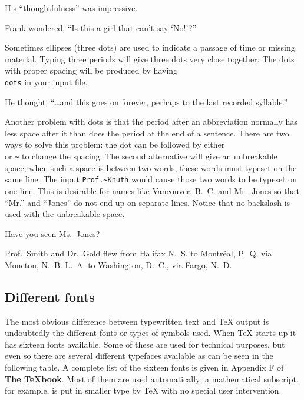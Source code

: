 \exercise His ``thoughtfulness'' was impressive. 

\exercise Frank wondered, ``Is this a girl that can't say `No!'?'' 
\bigskip 

Sometimes ellipses (three dots) are used to indicate a passage 
of time or missing material.  Typing three periods will give 
three dots very close together. The dots with proper spacing will 
be produced by having {\tt \\dots} in your input file. 

\exercise He thought, ``\dots and this goes on forever, perhaps to the 
last recorded syllable.'' 

Another problem with dots is that the period after an 
abbreviation normally has less space after it than does the 
period at the end of a sentence. There are two ways to solve this 
problem: the dot can be followed by either {\tt\\\sp} or {\tt\~{}} 
to change the spacing. 
The second alternative will give an unbreakable space; when such 
a space is between two words, these words must typeset on the 
same line. The input {\tt Prof.\~{}Knuth} would cause those two 
words to be typeset on one line.  This is desirable for names 
like Vancouver, B.~C. and Mr.~Jones so that ``Mr.'' and ``Jones'' 
do not end up on separate lines. Notice that no backslash is used 
with the unbreakable space. 

\exercise Have you seen Ms.~Jones? 

\exercise Prof.~Smith and Dr.~Gold flew from 
\ifcanspell 
Halifax N.~S. to Montr\'eal, P.~Q. via Moncton, N.~B. 
\else 
L.~A. to Washington, D.~C., via Fargo, N.~D. 
\fi 


\subsection{Different fonts} 

The most obvious difference between typewritten text and \TeX{} 
output is undoubtedly the different fonts or types of symbols 
used. When \TeX{} starts up it has sixteen fonts available.  Some 
of these are used for technical purposes, but even so there are 
several different typefaces available as can be seen in the 
following table. A complete list of the sixteen fonts is given in 
Appendix F of {\bf The \TeX{}book}. 
Most of them are used automatically; a mathematical subscript, 
for example, is put in smaller type by \TeX{} with no special 
user intervention. 

